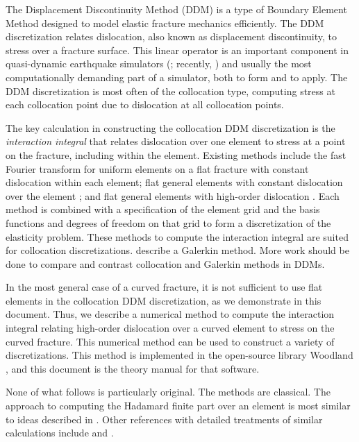\documentclass[11pt]{article}
\begin{document}
The Displacement Discontinuity Method (DDM) \citep{crouch1983boundary}
is a type of Boundary Element Method designed to model elastic fracture mechanics efficiently.
The DDM discretization relates dislocation, also known as displacement discontinuity, to stress over a fracture surface.
This linear operator is an important component in quasi-dynamic earthquake simulators
(\citep{rice1993spatio}; recently, \citep{ozawa2023large,herrera2024seismic})
and usually the most computationally demanding part of a simulator,
both to form and to apply.
The DDM discretization is most often of the collocation type,
computing stress at each collocation point due to dislocation at all collocation points.

The key calculation in constructing the collocation DDM discretization is the \emph{interaction integral}
that relates dislocation over one element to stress at a point on the fracture,
including within the element.
Existing methods include
the fast Fourier transform \citep[e.g.][Ch.~4]{segall2010earthquake} for uniform elements on a flat fracture with constant dislocation within each element;
flat general elements with constant dislocation over the element \citep{okada1992internal,meade2007algorithms,gimbutas2012calculation,barall2016performance};
and flat general elements with high-order dislocation \citep{shou1995higher,meade2022bem2d}.
Each method is combined with
a specification of the element grid
and the basis functions and degrees of freedom on that grid
to form a discretization of the elasticity problem.
These methods to compute the interaction integral are suited for collocation discretizations.
\citet{thompson2019boundary} describe a Galerkin method.
More work should be done to compare and contrast collocation and Galerkin methods in DDMs.

In the most general case of a curved fracture,
it is not sufficient to use flat elements in the collocation DDM discretization,
as we demonstrate in this document.
Thus, we describe a numerical method to
compute the interaction integral relating high-order dislocation over a curved element to stress on the curved fracture.
This numerical method can be used to construct a variety of discretizations.
This method is implemented in the open-source library Woodland \citep{woodland-software},
and this document is the theory manual for that software.

None of what follows is particularly original.
The methods are classical.
The approach to computing the Hadamard finite part over an element is most similar to ideas described in \citet{guiggiani1998formulation}.
Other references with detailed treatments of similar calculations include \citet{kanduvc2022isoparametric} and \citet{peng2017isogeometric}.
\end{document}
